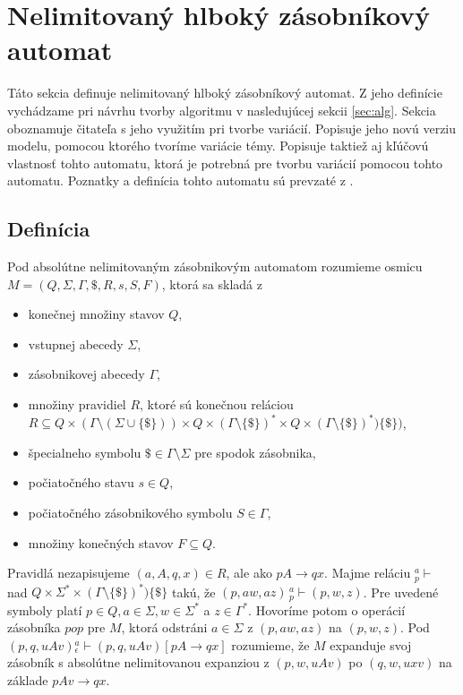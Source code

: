 \section{Nelimitovaný hlboký zásobníkový automat}
Táto sekcia definuje nelimitovaný hlboký zásobníkový automat. Z jeho definície vychádzame pri návrhu tvorby algoritmu v nasledujúcej sekcii \ref{sec:alg}. Sekcia oboznamuje čitateľa s jeho využitím pri tvorbe variácií. Popisuje jeho novú verziu modelu, pomocou ktorého tvoríme variácie témy. Popisuje taktiež aj kľúčovú vlastnosť tohto automatu, ktorá je potrebná pre tvorbu variácií pomocou tohto automatu. Poznatky a definícia tohto automatu sú prevzaté z \cite{FITPUB10978}.

\subsection{Definícia}
\begin{definition}
Pod absolútne nelimitovaným zásobnikovým automatom rozumieme osmicu $M = (Q, \Sigma, \Gamma, \$, R, s, S, F)$, ktorá sa skladá z
\begin{itemize}\itemsep0.05em
\item konečnej množiny stavov $Q$,
\item vstupnej abecedy $\Sigma$,
\item zásobnikovej abecedy $\Gamma$,
\item množiny pravidiel $R$, ktoré sú konečnou reláciou $R \subseteq Q \times (\Gamma \setminus (\Sigma \cup \{\$\})) \times Q \times (\Gamma \setminus \{\$\})^* \times Q \times (\Gamma \setminus \{\$\})^*)\{\$\})$,
\item špecialneho symbolu $\$ \in \Gamma \setminus \Sigma$ pre spodok zásobnika,
\item počiatočného stavu $s \in Q$,
\item počiatočného zásobnikového symbolu $S \in \Gamma$,
\item množiny konečných stavov $F \subseteq Q.$
\end{itemize}
\end{definition}

Pravidlá nezapisujeme $(a, A, q, x) \in R$, ale ako $pA \rightarrow qx$. Majme reláciu ${}^a_p\vdash$ nad $Q \times \Sigma^* \times (\Gamma \setminus \{\$\})^*)\{\$\}$ takú, že $(p, aw, az) \, {}^a_p\vdash (p, w, z)$. Pre uvedené symboly platí $p \in Q, a \in \Sigma, w \in \Sigma^*$ a $z \in \Gamma^*$. Hovoríme potom o operácií zásobníka $pop$ pre $M$, ktorá odstráni $a \in \Sigma$ z $(p, aw, az)$ na $(p, w, z)$. Pod $(p, q, uAv) {}^a_\epsilon \vdash (p, q, uAv)[pA \rightarrow qx]$ rozumieme, že $M$ expanduje svoj zásobník s absolútne nelimitovanou expanziou z $(p, w, uAv)$ po $(q, w, uxv)$ na základe $pAv \rightarrow qx$.

